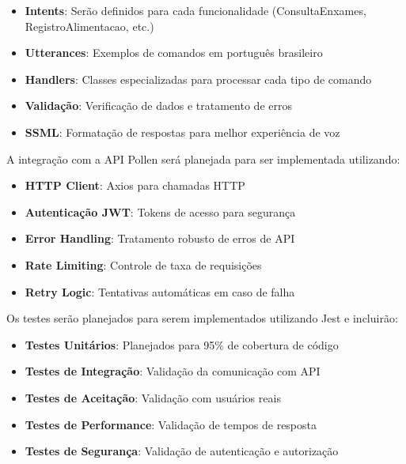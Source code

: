 \begin{itemize}
    \item \textbf{Intents}: Serão definidos para cada funcionalidade (ConsultaEnxames, RegistroAlimentacao, etc.)
    \item \textbf{Utterances}: Exemplos de comandos em português brasileiro
    \item \textbf{Handlers}: Classes especializadas para processar cada tipo de comando
    \item \textbf{Validação}: Verificação de dados e tratamento de erros
    \item \textbf{SSML}: Formatação de respostas para melhor experiência de voz
\end{itemize}


A integração com a API Pollen será planejada para ser implementada utilizando:

\begin{itemize}
    \item \textbf{HTTP Client}: Axios para chamadas HTTP
    \item \textbf{Autenticação JWT}: Tokens de acesso para segurança
    \item \textbf{Error Handling}: Tratamento robusto de erros de API
    \item \textbf{Rate Limiting}: Controle de taxa de requisições
    \item \textbf{Retry Logic}: Tentativas automáticas em caso de falha
\end{itemize}


Os testes serão planejados para serem implementados utilizando Jest e incluirão:

\begin{itemize}
    \item \textbf{Testes Unitários}: Planejados para 95\% de cobertura de código
    \item \textbf{Testes de Integração}: Validação da comunicação com API
    \item \textbf{Testes de Aceitação}: Validação com usuários reais
    \item \textbf{Testes de Performance}: Validação de tempos de resposta
    \item \textbf{Testes de Segurança}: Validação de autenticação e autorização
\end{itemize}


